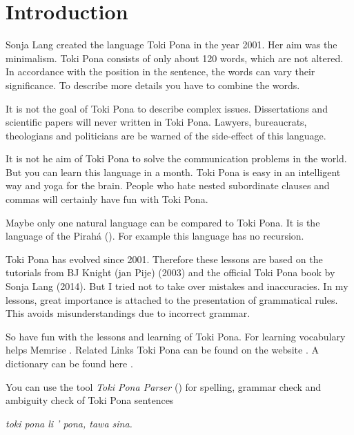 \section{Introduction}
%
Sonja Lang created the language Toki Pona in the year 2001. 
Her aim was the minimalism. 
Toki Pona consists of only about 120 words, which are not altered. 
In accordance with the position in the sentence, the words can vary their significance. 
To describe more details you have to combine the words.

It is not the goal of Toki Pona to describe complex issues. 
Dissertations and scientific papers will never written in Toki Pona. 
Lawyers, bureaucrats, theologians and politicians are be warned of the side-effect of this language.

It is not he aim of Toki Pona to solve the communication problems in the world. 
But you can learn this language in a month. 
Toki Pona is easy in an intelligent way and yoga for the brain. 
People who hate nested subordinate clauses and commas will certainly have fun with Toki Pona.

Maybe only one natural language can be compared to Toki Pona. 
It is the language of the Pirah\'{a} (\cite{www:piraha:01}). 
For example this language has no recursion. 

%
%
Toki Pona has evolved since 2001. 
Therefore these lessons are based on the tutorials from BJ Knight (jan Pije) \cite{www:Pije:01} (2003) and the official Toki Pona book \cite{www:tokipona.org} by Sonja Lang (2014). 
But I tried not to take over mistakes and inaccuracies. 
In my lessons, great importance is attached to the presentation of grammatical rules. 
This avoids misunderstandings due to incorrect grammar.

So have fun with the lessons and learning of Toki Pona. 
For learning vocabulary helps Memrise \cite{www:memrise:01}. Related Links Toki Pona can be found on the website \cite{www:rowa:01}. 
A dictionary can be found here \cite{www:rowa:01}. 

You can use the tool \textit{Toki Pona Parser} (\cite{www:rowa:02}) for spelling, grammar check and ambiguity check of Toki Pona sentences 


\textit{toki pona li ' pona, tawa sina.}
%

